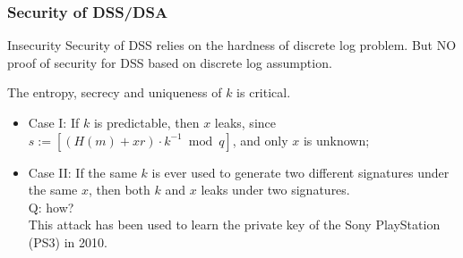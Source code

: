 
\begin{frame}\frametitle{Security of DSS/DSA}
\begin{alertblock}{Insecurity}
Security of DSS relies on the hardness of discrete log problem. But NO proof of security for DSS based on discrete log assumption.
\end{alertblock}

\begin{exampleblock}{The entropy, secrecy and uniqueness of $k$ is critical.}
\begin{itemize}
\item Case I: If $k$ is predictable, then $x$ leaks, since $s:= [(H(m)+xr)\cdot k^{-1} \bmod q]$, and only $x$ is unknown;
\item Case II: If the same $k$ is ever used to generate two different signatures under the same $x$, then both $k$ and $x$ leaks under two signatures.\\
\alert{Q: how?} \\

This attack has been used to learn the private key of the Sony PlayStation (PS3) in 2010.
\end{itemize}
\end{exampleblock}
\end{frame}

